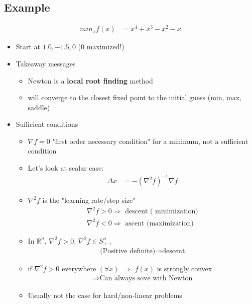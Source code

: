 \documentclass[11pt]{article}
\begin{document}
\subsection{Example}
\begin{align*}
    min_x f(x) &= x^4 + x^3 - x^2 - x
\end{align*}
\begin{itemize}
    \item Start at $1.0, -1.5, 0$ (0 maximized!)
    \item Takeaway messages
    \begin{itemize}
        \item Newton is a \textbf{local root finding} method
        \item will converge to the closest fixed point to the initial guess (min, max, saddle)
    \end{itemize}
    \item Sufficient conditions
    \begin{itemize}
        \item $\nabla f = 0$ "first order necessary condition" for a minimum, not a sufficient condition
        \item Let's look at scalar case:
        \begin{align*}
            \Delta x &= -\left(\nabla^2f\right)^{-1}\nabla f
        \end{align*}
        \item $\nabla^2f$ is the "learning rate/step size"
        \begin{align*}
            \nabla^2 f > 0 \Rightarrow \text{ descent ( minimization)}
            \\
            \nabla^2 f <0 \Rightarrow \text{ ascent (maximization)}
        \end{align*}
        \item In $\mathbb{R}^n$, $\nabla^2f>0$, $\nabla^2f \in S_{++}^n$ \begin{align*}
            \text{(Positive definite)} \Rightarrow \text{descent}
        \end{align*}
        \item if $\nabla^2 f>0$ everywhere $(\forall x)$ $\Rightarrow$ $f(x)$ is strongly convex
        \begin{align*}
            \Rightarrow \text{Can always sove with Newton}
        \end{align*}
        \item Usually not the case for hard/non-linear problems
    \end{itemize}

\end{itemize}
\end{document}
